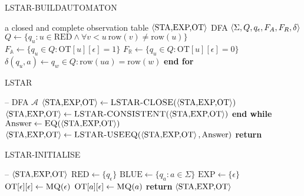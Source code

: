 \begin{algorithm}
\caption{LSTAR-BUILDAUTOMATON}\label{alg:lstar-buildautomaton}
\begin{algorithmic}[1]
\Statex
\Input a closed and complete observation table $\Braket{\text{STA,EXP,OT}}$
\Output DFA $\Braket{\Sigma,Q,q_\epsilon,F_A,F_R,\delta}$
\State $Q \gets \{q_u : u \in \text{RED} \land \forall v < u \: \text{row}(v) \ne \text{row}(u)\}$
\State $F_{\mathbb{A}} \gets \{q_u \in Q : \text{OT}[u][\epsilon] = 1\}$
\State $F_{\mathbb{R}} \gets \{q_u \in Q : \text{OT}[u][\epsilon] = 0\}$
      $\delta(q_u,a) \gets q_w \in Q : \text{row}(ua) = \text{row}(w)$
     \EndFor
\EndFor
\State \textbf{end for}
\State {}
\end{algorithmic}
\end{algorithm}

\begin{algorithm}
\caption{LSTAR}\label{alg:lstar}
\begin{algorithmic}[1]
\Statex
\Input --
\Output DFA $\mathcal{A}$
\State {}
\Repeat
          \vspace{0.5mm}
               \State $\Braket{\text{STA,EXP,OT}} \gets \Call{LSTAR-CLOSE}{\Braket{\text{STA,EXP,OT}}} $
          \EndIf
          \vspace{0.5mm}
               \State $\Braket{\text{STA,EXP,OT}} \gets \Call{LSTAR-CONSISTENT}{\Braket{\text{STA,EXP,OT}}} $ 
          \EndIf    
     \EndWhile
     \State \textbf{end while}
     \State $\text{Answer} \gets \Call{EQ}{\Braket{\text{STA,EXP,OT}}}$
          \vspace{0.25mm}
          \State $\Braket{\text{STA,EXP,OT}} \gets \Call{LSTAR-USEEQ}{\Braket{\text{STA,EXP,OT}},\text{Answer}}$
     \EndIf
{}
\State \textbf{return} 
\end{algorithmic}
\end{algorithm}

\begin{algorithm}
\caption{LSTAR-INITIALISE}\label{alg:lstar-initialise}
\begin{algorithmic}[1]
\Statex
\Input --
\Output $\Braket{\text{STA,EXP,OT}}$
\State $\text{RED} \gets \{q_\epsilon\}$
\State $\text{BLUE} \gets \{q_a : a \in \Sigma\}$
\State $\text{EXP} \gets \{\epsilon\}$
\State $\text{OT}[\epsilon][\epsilon] \gets \Call{MQ}{\epsilon}$
\vspace{1mm}
 $\text{OT}[a][\epsilon] \gets \Call{MQ}{a}$
\EndFor
\State \textbf{return} $\Braket{\text{STA,EXP,OT}}$
\end{algorithmic}
\end{algorithm}

